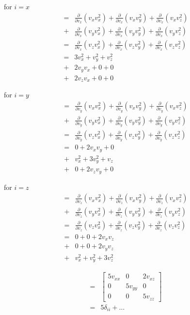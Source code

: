 \documentclass[paper=a4, fontsize=12pt]{scrartcl}
\begin{document}
for $i = x $
\begin{align*}
=&
 \frac{\partial}{\partial v_x}(v_x v_x^2)
+\frac{\partial}{\partial v_x}(v_x v_y^2)
+\frac{\partial}{\partial v_x}(v_x v_z^2)\\
+& 
 \frac{\partial}{\partial v_x}(v_y v_x^2)
+\frac{\partial}{\partial v_x}(v_y v_y^2)
+\frac{\partial}{\partial v_x}(v_y v_z^2)\\
=&
 \frac{\partial}{\partial v_x}(v_z v_x^2)
+\frac{\partial}{\partial v_x}(v_z v_y^2)
+\frac{\partial}{\partial v_x}(v_z v_z^2)\\
=&
	3 v_x^2 + v_y^2 + v_z^2\\
+&  2 v_y v_x + 0 + 0 \\
+&  2v_zv_x + 0 + 0 
\end{align*}	

for $i = y $
\begin{align*}
=&
 \frac{\partial}{\partial v_y}(v_x v_x^2)
+\frac{\partial}{\partial v_y}(v_x v_y^2)
+\frac{\partial}{\partial v_y}(v_x v_z^2)\\
+& 
 \frac{\partial}{\partial v_y}(v_y v_x^2)
+\frac{\partial}{\partial v_y}(v_y v_y^2)
+\frac{\partial}{\partial v_y}(v_y v_z^2)\\
=&
 \frac{\partial}{\partial v_y}(v_z v_x^2)
+\frac{\partial}{\partial v_y}(v_z v_y^2)
+\frac{\partial}{\partial v_y}(v_z v_z^2)\\
=&
     0 + 2v_xv_y + 0\\
+&   v_x^2 + 3v_y^2 + v_z \\
+&   0 + 2v_zv_y + 0 
\end{align*}	

for $i = z $
\begin{align*}
=&
 \frac{\partial}{\partial v_z}(v_x v_x^2)
+\frac{\partial}{\partial v_z}(v_x v_y^2)
+\frac{\partial}{\partial v_z}(v_x v_z^2)\\
+& 
 \frac{\partial}{\partial v_z}(v_y v_x^2)
+\frac{\partial}{\partial v_z}(v_y v_y^2)
+\frac{\partial}{\partial v_z}(v_y v_z^2)\\
=&
 \frac{\partial}{\partial v_z}(v_z v_x^2)
+\frac{\partial}{\partial v_z}(v_z v_y^2)
+\frac{\partial}{\partial v_z}(v_z v_z^2)\\
=&
0 + 0 + 2v_xv_z\\
+&   0 + 0 + 2v_yv_z \\
+&   v_x^2 + v_y^2 + 3v_z^2 
\end{align*}	

\begin{align*}
=&\begin{bmatrix}
 5v_{xx} & 0&2v_{xz} \\
 0 & 5 v_{yy} & 0 \\
 0 & 0 & 5v_{zz}
\end{bmatrix}\\
=& 5 \delta_{ii} + \dots
\end{align*}
\end{document}
